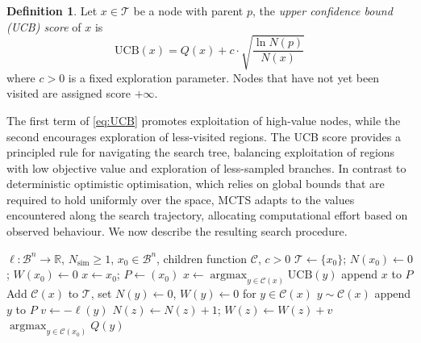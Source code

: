 \documentclass[10pt]{article}
\theoremstyle{definition}
\newtheorem{definition}[theorem]{Definition}
\newcommand{\RR}{\mathbb{R}}
\DeclareMathOperator{\argmax}{argmax}
\begin{document}
\begin{definition}
    Let $x \in \mathcal{T}$ be a node with parent $p$, the \emph{upper confidence bound (UCB) score} of $x$ is
\begin{equation}
\label{eq:UCB}
        \mathrm{UCB}(x) = Q(x) + c \cdot \sqrt{\frac{\ln N(p)}{N(x)}}
\end{equation}
    where $c > 0$ is a fixed exploration parameter. Nodes that have not yet been visited are assigned score $+\infty$.
\end{definition}

The first term of \eqref{eq:UCB} promotes exploitation of high-value nodes, while the second encourages exploration of less-visited regions. The UCB score provides a principled rule for navigating the search tree, balancing exploitation of regions with low objective value and exploration of less-sampled branches. In contrast to deterministic optimistic optimisation, which relies on global bounds that are required to hold uniformly over the space, MCTS adapts to the values encountered along the search trajectory, allocating computational effort based on observed behaviour. We now describe the resulting search procedure.

\begin{algorithm}[H]
  \begin{algorithmic}[1]
    \Require $\ell \colon \mathcal{B}^n \to \RR$, $N_\mathrm{sim} \ge 1$, $x_0 \in \mathcal{B}^n$, children function $\mathcal{C}$, $c > 0$
    \State $\mathcal{T} \gets \{x_0\}$; $N(x_0) \gets 0$; $W(x_0) \gets 0$
      \State $x \gets x_0$; $P \gets (x_0)$ 
        \State $x \gets \argmax_{y \in \mathcal{C}(x)} \mathrm{UCB}(y)$
        \State append $x$ to $P$
      \EndWhile
      \State Add $\mathcal{C}(x)$ to $\mathcal{T}$, set $N(y) \gets 0$, $W(y) \gets 0$ for $y \in \mathcal{C}(x)$ 
      \State $y \sim \mathcal{C}(x)$
      \State append $y$ to $P$
      \State $v \gets -\ell(y)$ 
       
        \State $N(z) \gets N(z) + 1$; $W(z) \gets W(z) + v$
      \EndFor
    \EndFor
    \Return $\argmax_{y \in \mathcal{C}(x_0)} Q(y)$ 
  \end{algorithmic}
  \caption{Update Rule for MCTS on Polydisc Space}
  \label{alg:mcts-update}
\end{algorithm}
\end{document}
